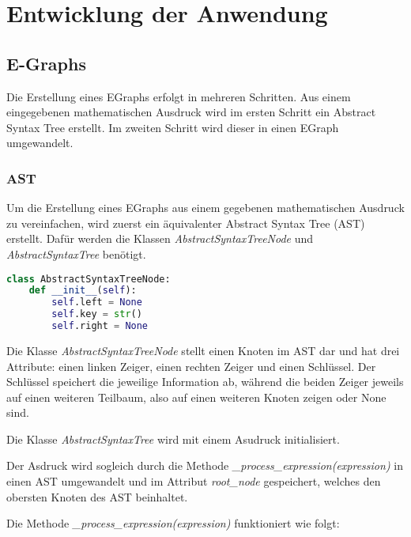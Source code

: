 \section{Entwicklung der Anwendung}\label{sec:entwicklung}

\subsection{E-Graphs}

Die Erstellung eines EGraphs erfolgt in mehreren Schritten. Aus einem eingegebenen mathematischen Ausdruck wird im ersten Schritt ein Abstract Syntax Tree erstellt.
Im zweiten Schritt wird dieser in einen EGraph umgewandelt.

\subsubsection{AST}

Um die Erstellung eines EGraphs aus einem gegebenen mathematischen Ausdruck zu vereinfachen, wird zuerst ein äquivalenter Abstract Syntax Tree (AST)
erstellt. Dafür werden die Klassen \textit{AbstractSyntaxTreeNode} und \textit{AbstractSyntaxTree} benötigt.

\begin{lstlisting}[language=Python, caption=Klasse \textit{AbstractSyntaxTreeNode}]
class AbstractSyntaxTreeNode:
    def __init__(self):
        self.left = None
        self.key = str()
        self.right = None
\end{lstlisting}

Die Klasse \textit{AbstractSyntaxTreeNode} stellt einen Knoten im AST dar und hat drei Attribute: einen linken Zeiger, einen rechten Zeiger und einen Schlüssel.
Der Schlüssel speichert die jeweilige Information ab, während die beiden Zeiger jeweils auf einen weiteren Teilbaum, also auf einen weiteren Knoten zeigen oder None sind.


Die Klasse \textit{AbstractSyntaxTree} wird mit einem Asudruck initialisiert. 

Der Asdruck wird sogleich durch die Methode \textit{\_process\_expression(expression)}
in einen AST umgewandelt und im Attribut \textit{root\_node} gespeichert, welches den obersten Knoten des AST beinhaltet.


Die Methode \textit{\_process\_expression(expression)} funktioniert wie folgt:

